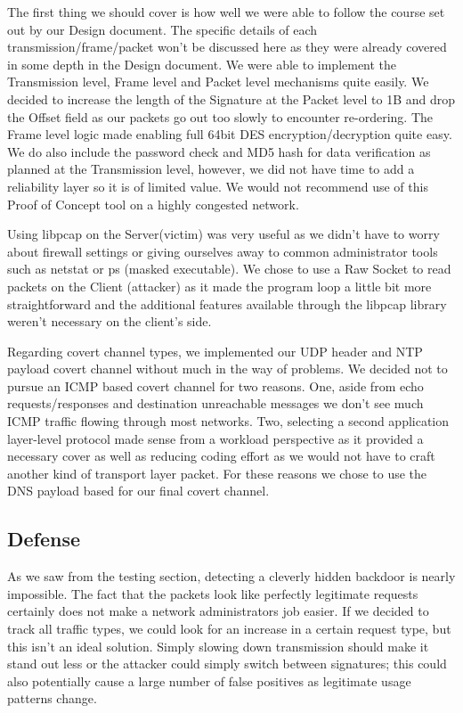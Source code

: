 \documentclass[titlepage]{article}
\begin{document}
The first thing we should cover is how well we were able to follow the course set out by our Design document.  The specific details of each transmission/frame/packet won't be discussed here as they were already covered in some depth in the Design document. We were able to implement the Transmission level, Frame level and Packet level mechanisms quite easily.  We decided to increase the length of the Signature at the Packet level to 1B and drop the Offset field as our packets go out too slowly to encounter re-ordering.  The Frame level logic made enabling full 64bit DES encryption/decryption quite easy.  We do also include the password check and MD5 hash for data verification as planned at the Transmission level, however, we did not have time to add a reliability layer so it is of limited value. We would not recommend use of this Proof of Concept tool on a highly congested network.

Using libpcap on the Server(victim) was very useful as we didn't have to worry about firewall settings or giving ourselves away to common administrator tools such as netstat or ps (masked executable).  We chose to use a Raw Socket to read packets on the Client (attacker) as it made the program loop a little bit more straightforward and the additional features available through the libpcap library weren't necessary on the client's side.

Regarding covert channel types, we implemented our UDP header and NTP payload covert channel without much in the way of problems.  We decided not to pursue an ICMP based covert channel for two reasons. One, aside from echo requests/responses and destination unreachable messages we don't see much ICMP traffic flowing through most networks. Two, selecting a second application layer-level protocol made sense from a workload perspective as it provided a necessary cover as well as reducing coding effort as we would not have to craft another kind of transport layer packet.  For these reasons we chose to use the DNS payload based for our final covert channel.

\subsection{Defense}

As we saw from the testing section, detecting a cleverly hidden backdoor is nearly impossible.  The fact that the packets look like perfectly legitimate requests certainly does not make a network administrators job easier. If we decided to track all traffic types, we could look for an increase in a certain request type, but this isn't an ideal solution. Simply slowing down transmission should make it stand out less or the attacker could simply switch between signatures; this could also potentially cause a large number of false positives as legitimate usage patterns change.
\end{document}

